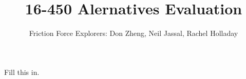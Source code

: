 \documentclass[a4paper,10pt]{article}
\title{16-450 Alernatives Evaluation}
\author{Friction Force Explorers: Don Zheng, Neil Jassal, Rachel Holladay}
\begin{document}
\maketitle
  
Fill this in. 
\end{document}
